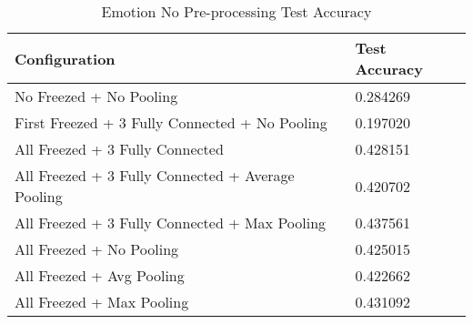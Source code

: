 \begin{table}[H] \centering

\makeatletter
\def\rulecolor#1#{\CT@arc{#1}}
\def\CT@arc#1#2{%
\ifdim\baselineskip=\z@\noalign\fi
{\gdef\CT@arc@{\color#1{#2}}}}
\let\CT@arc@\relax
{}
\makeatother
        
\begin{tabular}{@{}l|l@{}}
	\toprule
    Configuration & Test Accuracy \\
    
    \midrule
	No Freezed + No Pooling & 0.284269 \\
    First Freezed + 3 Fully Connected + No Pooling & 0.197020 \\
    
    All Freezed + 3 Fully Connected & 0.428151 \\
    All Freezed + 3 Fully Connected + Average Pooling & 0.420702 \\
	All Freezed + 3 Fully Connected + Max Pooling & 0.437561 \\

    All Freezed + No Pooling & 0.425015 \\
    All Freezed + Avg Pooling & 0.422662 \\
    All Freezed + Max Pooling & 0.431092 \\
    \bottomrule
\end{tabular}
    
	\caption{Emotion No Pre-processing Test Accuracy} 
    \label{table:fake-emotion_nopre}

\end{table}